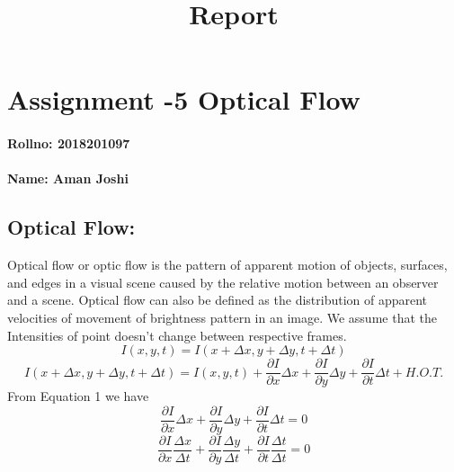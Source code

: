 \documentclass[11pt]{article}
\title{Report}
\begin{document}
    
    
    \maketitle
    
    

    
    \hypertarget{assignment--5-optical-flow}{%
\section{\texorpdfstring{Assignment -5 \textbf{Optical
Flow}}{Assignment -5 Optical Flow}}\label{assignment--5-optical-flow}}

\hypertarget{rollno-2018201097}{%
\paragraph{Rollno: 2018201097}\label{rollno-2018201097}}

\hypertarget{name-aman-joshi}{%
\paragraph{Name: Aman Joshi}\label{name-aman-joshi}}

    \hypertarget{optical-flow}{%
\subsection{Optical Flow:}\label{optical-flow}}

Optical flow or optic flow is the pattern of apparent motion of objects,
surfaces, and edges in a visual scene caused by the relative motion
between an observer and a scene. Optical flow can also be defined as the
distribution of apparent velocities of movement of brightness pattern in
an image. We assume that the Intensities of point doesn't change between
respective frames. \begin{equation*}
I(x,y,t) = I(x+\Delta x, y + \Delta y, t + \Delta t)
\end{equation*} \begin{equation}
I(x+\Delta x,y+\Delta y,t+\Delta t) = I(x,y,t) + \frac{\partial I}{\partial x}\Delta x+\frac{\partial I}{\partial y}\Delta y+\frac{\partial I}{\partial t}\Delta t+H.O.T.
\end{equation} From Equation 1 we have \begin{equation*}
\frac{\partial I}{\partial x}\Delta x+\frac{\partial I}{\partial y}\Delta y+\frac{\partial I}{\partial t}\Delta t = 0
\end{equation*} \begin{equation*}
\frac{\partial I}{\partial x}\frac{\Delta x}{\Delta t}+\frac{\partial I}{\partial y}\frac{\Delta y}{\Delta t}+\frac{\partial I}{\partial t}\frac{\Delta t}{\Delta t} = 0
\end{equation*}
\end{document}
